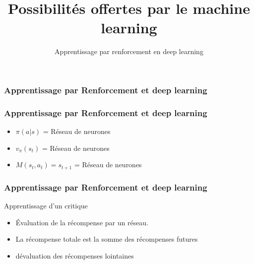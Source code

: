 \documentclass{formation}
\title{Possibilités offertes par le machine learning}
\subtitle{Apprentissage par renforcement en deep learning}
\begin{document}
\maketitle

\begin{frame}
  \frametitle{Apprentissage par Renforcement et deep learning}
\end{frame}

\begin{frame}
  \frametitle{Apprentissage par Renforcement et deep learning}
  \begin{itemize}
  \item \textbf{$\pi(a | s)$} = Réseau de neurones
  \item \textbf{$v_{\pi}(s_t)$} = Réseau de neurones
  \item \textbf{$M(s_t,a_t)=s_{t+1}$} = Réseau de neurones
  \end{itemize}
\end{frame}

\begin{frame}
  \frametitle{Apprentissage par Renforcement et deep learning}
  Apprentissage d'un critique
  \begin{itemize}
  \item Évaluation de la récompense par un réseau.
  \item La récompense totale est la somme des récompenses futures
  \item dévaluation des récompenses lointaines
  \end{itemize}
\end{frame}
\end{document}
